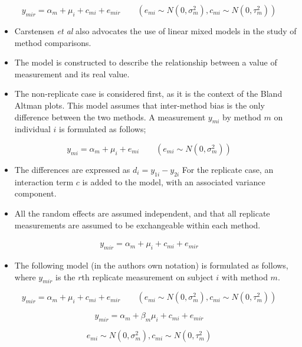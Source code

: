 \begin{equation}
y_{mir}  = \alpha_{m} + \mu_{i} + c_{mi} + e_{mir} \qquad ( e_{mi}
\sim N(0,\sigma^{2}_{m}), c_{mi} \sim N(0,\tau^{2}_{m}))
\end{equation}


%
\large
\begin{itemize}
\item Carstensen \textit{et al} \cite{BXC2004} also advocates the use of linear mixed models in
the study of method comparisons. 
\item The model is constructed to
describe the relationship between a value of measurement and its
real value.
\item  The non-replicate case is considered first, as it is
the context of the Bland Altman plots. This model assumes that
inter-method bias is the only difference between the two methods.
A measurement $y_{mi}$ by method $m$ on individual $i$ is
formulated as follows;
\end{itemize}
\begin{equation}
y_{mi}  = \alpha_{m} + \mu_{i} + e_{mi} \qquad ( e_{mi} \sim
N(0,\sigma^{2}_{m}))
\end{equation}


%
\Large
\begin{itemize}
\item The differences are expressed as $d_{i} = y_{1i} - y_{2i}$ For the
replicate case, an interaction term $c$ is added to the model,
with an associated variance component. 
\item All the random effects are
assumed independent, and that all replicate measurements are
assumed to be exchangeable within each method.
\end{itemize}
\begin{eqnarray}
y_{mir}  = \alpha_{m} + \mu_{i} + c_{mi} + e_{mir} 
\end{eqnarray}

%
\large
\begin{itemize}
\item The following model (in the authors own notation) is
formulated as follows, where $y_{mir}$ is the $r$th replicate
measurement on subject $i$ with method $m$.
\end{itemize}
{
\LARGE
\begin{equation}
y_{mir}  = \alpha_{m} + \mu_{i} + c_{mi} + e_{mir} \qquad ( e_{mi}
\sim N(0,\sigma^{2}_{m}), c_{mi} \sim N(0,\tau^{2}_{m}))
\end{equation}


\begin{equation}
y_{mir}  = \alpha_{m} + \beta_{m}\mu_{i} + c_{mi} + e_{mir} 
\end{equation}
}
\vspace{0.3cm}
{
\normalsize
\[ e_{mi} \sim N(0,\sigma^{2}_{m}), c_{mi} \sim N(0,\tau^{2}_{m})\]
}

